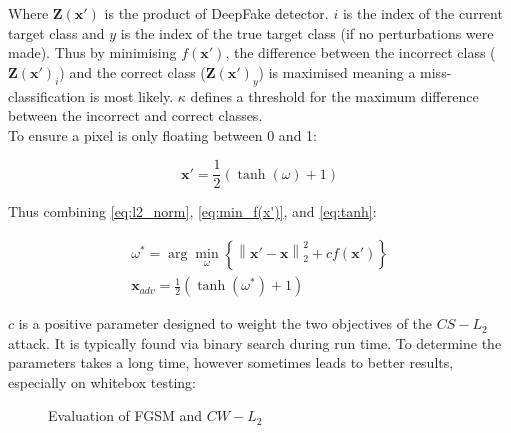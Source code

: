 \documentclass{article}
\begin{document}
Where $\mathbf{Z}(\mathbf{x}')$ is the product of DeepFake detector. $i$ is the index of the current target class and $y$ is the index of the true target class (if no perturbations were made). Thus by minimising $f(\mathbf{x}')$, the difference between the incorrect class ($\mathbf{Z}{{\left( {{\mathbf{x}}'} \right)}_i}$) and the correct class (${\mathbf{Z}}{{\left( {{\mathbf{x}}'} \right)}_y}$) is maximised meaning a miss-classification is most likely. $\kappa$ defines a threshold for the maximum difference between the incorrect and correct classes.\\

To ensure a pixel is only floating between 0 and 1:

\begin{equation}
\label{eq:tanh}
    {\mathbf{x}}' = \frac{1}{2}(\tanh (\omega ) + 1)
\end{equation}

Thus combining \ref{eq:l2_norm}, \ref{eq:min_f(x')}, and \ref{eq:tanh}:

\begin{equation}
\begin{array}{c}
{{\omega ^{\ast}} = \arg {{\min }_\omega }\left\{ {\left\| {{\mathbf{x}}' - {\mathbf{x}}} \right\|_2^2 + cf\left( {{\mathbf{x}}'} \right)} \right\}} \\ {{{\mathbf{x}}_{adv}} = \frac{1}{2}\left( {\tanh \left( {{\omega ^{\ast}}} \right) + 1} \right)}
\end{array}
\end{equation}

$c$ is a positive parameter designed to weight the two objectives of the $CS-L_2$ attack. It is typically found via binary search during run time. To determine the parameters takes a long time, however sometimes leads to better results, especially on whitebox testing:

\begin{figure}[H]
    \centering
    \caption{Evaluation of FGSM and $CW-L_2$}
    \label{fig:fgsm}
\end{figure}
\end{document}
